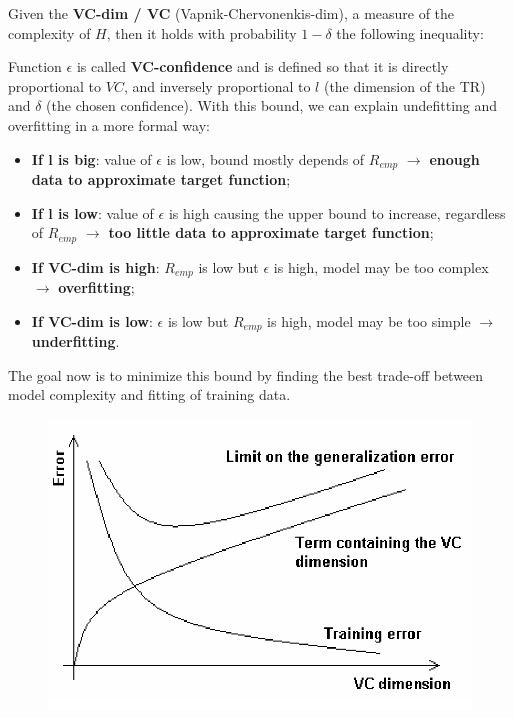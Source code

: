 Given the \textbf{VC-dim / VC} (Vapnik-Chervonenkis-dim), a measure of the complexity of $H$, then it holds with probability $1-\delta$ the following inequality:

\begin{center}
\end{center}

Function $\epsilon$ is called \textbf{VC-confidence} and is defined so that it is directly proportional to $VC$, and inversely proportional to $l$ (the dimension of the TR) and $\delta$ (the chosen confidence). With this bound, we can explain undefitting and overfitting in a more formal way:

\begin{itemize}
    \item \textbf{If l is big}: value of $\epsilon$ is low, bound mostly depends of $R_{emp}$ $\xrightarrow{}$ \textbf{enough data to approximate target function};

    \item \textbf{If l is low}: value of $\epsilon$ is high causing the upper bound to increase, regardless of $R_{emp}$ $\xrightarrow{}$ \textbf{too little data to approximate target function};

    \item \textbf{If VC-dim is high}: $R_{emp}$ is low but $\epsilon$ is high, model may be too complex $\xrightarrow{}$ \textbf{overfitting};

    \item \textbf{If VC-dim is low}: $\epsilon$ is low but $R_{emp}$ is high, model may be too simple $\xrightarrow{}$ \textbf{underfitting}.
\end{itemize}

The goal now is to minimize this bound by finding the best trade-off between model complexity and fitting of training data.

\begin{figure}[h]
    \centering
    \includegraphics[width=0.5\linewidth]{img/Illustration-of-the-Structural-Risk-Minimization-Principle.png}
\end{figure}

